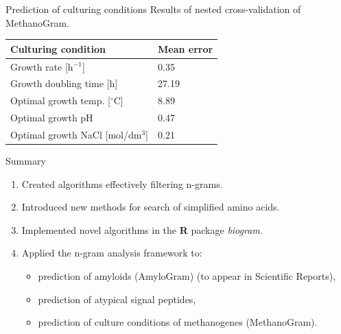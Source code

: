 \documentclass{beamer}\usepackage[]{graphicx}\usepackage[]{color}
\begin{document}
\begin{frame}{Prediction of culturing conditions}
Results of nested cross-validation of MethanoGram.
\begin{table}[ht]
\centering
\begin{tabular}{ll}
  \hline
Culturing condition & Mean error \\ 
  \hline
Growth rate [h$^{-1}$] & 0.35 \\ 
Growth doubling time [h] &  27.19 \\ 
Optimal growth temp. [$^{\circ}$C] & 8.89 \\ 
Optimal growth pH & 0.47 \\ 
Optimal growth NaCl [mol/dm$^3$] & 0.21 \\ 
   \hline
\end{tabular}
\label{tab:nested_cv}
\end{table}

\end{frame}  



\begin{frame}{Summary}
\begin{enumerate}
\item Created algorithms effectively filtering n-grams.

\item Introduced new methods for search of simplified amino acids.

\item Implemented novel algorithms in the \textbf{R} package \textit{biogram}.

\item Applied the n-gram analysis framework to:
\begin{itemize}
\item prediction of amyloids (AmyloGram) (to appear in Scientific Reports),
\item prediction of atypical signal peptides,
\item prediction of culture conditions of methanogenes (MethanoGram).
\end{itemize}
\end{enumerate}
\end{frame}  
\end{document}
